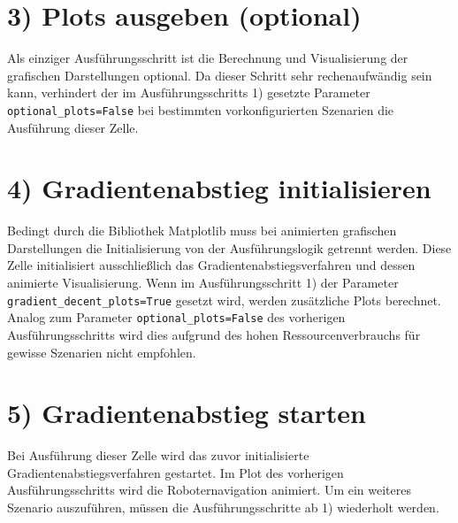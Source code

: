 \section*{3) Plots ausgeben (optional)}
Als einziger Ausführungsschritt ist die Berechnung und Visualisierung der grafischen Darstellungen optional. Da dieser Schritt sehr rechenaufwändig sein kann, verhindert der im Ausführungsschritts 1) gesetzte Parameter \texttt{optional\_plots=False} bei bestimmten vorkonfigurierten Szenarien die Ausführung dieser Zelle.

\section*{4) Gradientenabstieg initialisieren}
Bedingt durch die Bibliothek Matplotlib muss bei animierten grafischen Darstellungen die Initialisierung von der Ausführungslogik getrennt werden.
Diese Zelle initialisiert ausschließlich das Gradientenabstiegsverfahren und dessen animierte Visualisierung. Wenn im Ausführungsschritt 1) der Parameter \texttt{gradient\_decent\_plots=True} gesetzt wird, werden zusätzliche Plots berechnet. Analog zum Parameter \texttt{optional\_plots=False} des vorherigen Ausführungsschritts wird dies aufgrund des hohen Ressourcenverbrauchs für gewisse Szenarien nicht empfohlen.

\section*{5) Gradientenabstieg starten}
Bei Ausführung dieser Zelle wird das zuvor initialisierte Gradientenabstiegsverfahren gestartet. Im Plot des vorherigen Ausführungsschritts wird die Roboternavigation animiert.
Um ein weiteres Szenario auszuführen, müssen die Ausführungsschritte ab 1) wiederholt werden.


